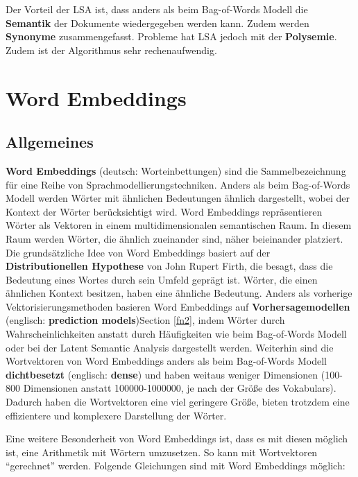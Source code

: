 \documentclass[11pt]{article}
\begin{document}
Der Vorteil der LSA ist, dass anders als beim Bag-of-Words Modell die
\textbf{Semantik} der Dokumente wiedergegeben werden kann. Zudem werden
\textbf{Synonyme} zusammengefasst. Probleme hat LSA jedoch mit der
\textbf{Polysemie}. Zudem ist der Algorithmus sehr rechenaufwendig.

    \hypertarget{word-embeddings}{%
\section{Word Embeddings}\label{word-embeddings}}

\hypertarget{allgemeines}{%
\subsection{Allgemeines}\label{allgemeines}}

\textbf{Word Embeddings} (deutsch: Worteinbettungen) sind die
Sammelbezeichnung für eine Reihe von Sprachmodellierungstechniken.
Anders als beim Bag-of-Words Modell werden Wörter mit ähnlichen
Bedeutungen ähnlich dargestellt, wobei der Kontext der Wörter
berücksichtigt wird. Word Embeddings repräsentieren Wörter als Vektoren
in einem multidimensionalen semantischen Raum. In diesem Raum werden
Wörter, die ähnlich zueinander sind, näher beieinander platziert. Die
grundsätzliche Idee von Word Embeddings basiert auf der
\textbf{Distributionellen Hypothese} von John Rupert Firth, die besagt,
dass die Bedeutung eines Wortes durch sein Umfeld geprägt ist. Wörter,
die einen ähnlichen Kontext besitzen, haben eine ähnliche Bedeutung.
Anders als vorherige Vektorisierungsmethoden basieren Word Embeddings
auf \textbf{Vorhersagemodellen} (englisch: \textbf{prediction
models})Section \ref{fn2}, indem Wörter durch Wahrscheinlichkeiten
anstatt durch Häufigkeiten wie beim Bag-of-Words Modell oder bei der
Latent Semantic Analysis dargestellt werden. Weiterhin sind die
Wortvektoren von Word Embeddings anders als beim Bag-of-Words Modell
\textbf{dichtbesetzt} (englisch: \textbf{dense}) und haben weitaus
weniger Dimensionen (100-800 Dimensionen anstatt 100000-1000000, je nach
der Größe des Vokabulars). Dadurch haben die Wortvektoren eine viel
geringere Größe, bieten trotzdem eine effizientere und komplexere
Darstellung der Wörter.

Eine weitere Besonderheit von Word Embeddings ist, dass es mit diesen
möglich ist, eine Arithmetik mit Wörtern umzusetzen. So kann mit
Wortvektoren ``gerechnet'' werden. Folgende Gleichungen sind mit Word
Embeddings möglich:
\end{document}
